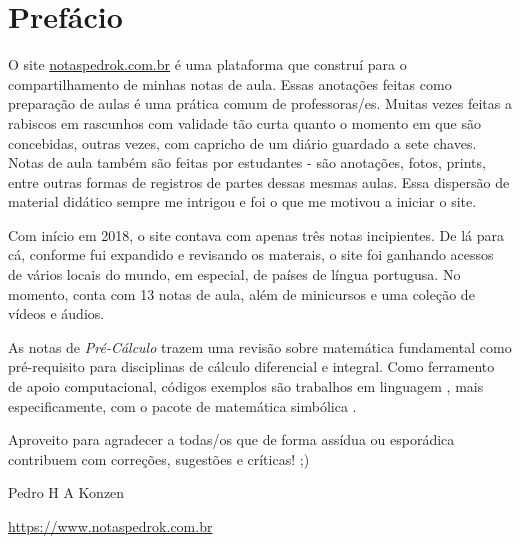 
\chapter*{Prefácio}\label{prefacio}

O site \href{https://www.notaspedrok.com.br}{notaspedrok.com.br} é uma plataforma que construí para o compartilhamento de minhas notas de aula. Essas anotações feitas como preparação de aulas é uma prática comum de professoras/es. Muitas vezes feitas a rabiscos em rascunhos com validade tão curta quanto o momento em que são concebidas, outras vezes, com capricho de um diário guardado a sete chaves. Notas de aula também são feitas por estudantes - são anotações, fotos, prints, entre outras formas de registros de partes dessas mesmas aulas. Essa dispersão de material didático sempre me intrigou e foi o que me motivou a iniciar o site.

Com início em 2018, o site contava com apenas três notas incipientes. De lá para cá, conforme fui expandido e revisando os materais, o site foi ganhando acessos de vários locais do mundo, em especial, de países de língua portugusa. No momento, conta com 13 notas de aula, além de minicursos e uma coleção de vídeos e áudios.

As notas de \emph{Pré-Cálculo} trazem uma revisão sobre matemática fundamental como pré-requisito para disciplinas de cálculo diferencial e integral. Como ferramento de apoio computacional, códigos exemplos são trabalhos em linguagem {\python}, mais especificamente, com o pacote de matemática simbólica {\sympy}.

Aproveito para agradecer a todas/os que de forma assídua ou esporádica contribuem com correções, sugestões e críticas! ;)

\begin{flushright}
  Pedro H A Konzen

  \url{https://www.notaspedrok.com.br}
\end{flushright}

